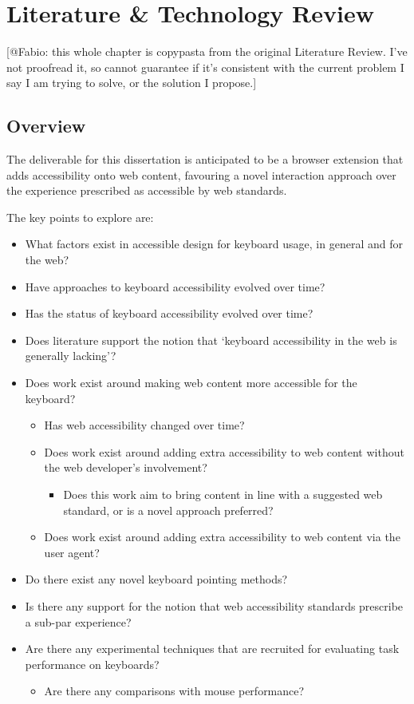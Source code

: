 \documentclass[a4paper, 12pt]{report}
\begin{document}
\chapter{Literature \& Technology Review}
\label{chap:litreview}
[@Fabio: this whole chapter is copypasta from the original Literature Review. I've not proofread it, so cannot guarantee if it's consistent with the current problem I say I am trying to solve, or the solution I propose.]
\section{Overview}
The deliverable for this dissertation is anticipated to be a browser extension that adds accessibility onto web content, favouring a novel interaction approach over the experience prescribed as accessible by web standards.

The key points to explore are:
\begin{itemize}
\item What factors exist in accessible design for keyboard usage, in general and for the web?
\item Have approaches to keyboard accessibility evolved over time?
\item Has the status of keyboard accessibility evolved over time?
\item Does literature support the notion that `keyboard accessibility in the web is generally lacking'?
\item Does work exist around making web content more accessible for the keyboard?
\begin{itemize}
\item Has web accessibility changed over time?
\item Does work exist around adding extra accessibility to web content without the web developer's involvement?
\begin{itemize}
\item Does this work aim to bring content in line with a suggested web standard, or is a novel approach preferred?
\end{itemize}
\item Does work exist around adding extra accessibility to web content via the user agent?
\end{itemize}
\item Do there exist any novel keyboard pointing methods?
\item Is there any support for the notion that web accessibility standards prescribe a sub-par experience?
\item Are there any experimental techniques that are recruited for evaluating task performance on keyboards?
\begin{itemize}
\item Are there any comparisons with mouse performance?
\end{itemize}
\end{itemize}
\end{document}
